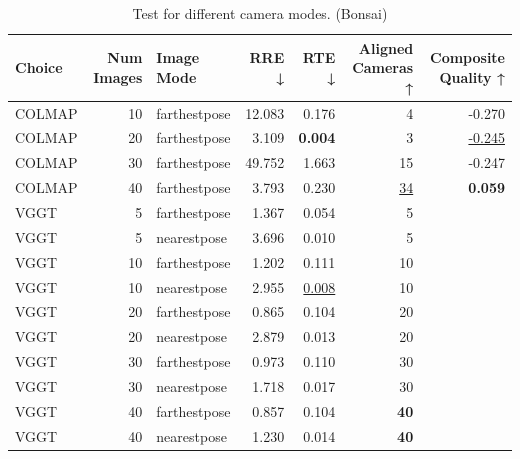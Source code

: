 \begin{table}[H]
\caption{Test for different camera modes. (Bonsai)}
\label{tab:99_nearest_pose_bonsai}
\begin{tabular}{lrlrrrr}
\toprule
Choice & Num Images & Image Mode & RRE ↓ & RTE ↓ & Aligned Cameras ↑ & Composite Quality ↑ \\
\midrule
COLMAP & 10 & farthestpose & 12.083 & 0.176 & 4 & -0.270 \\
COLMAP & 20 & farthestpose & 3.109 & \textbf{0.004} & 3 & \underline{-0.245} \\
COLMAP & 30 & farthestpose & 49.752 & 1.663 & 15 & -0.247 \\
COLMAP & 40 & farthestpose & 3.793 & 0.230 & \underline{34} & \textbf{0.059} \\
VGGT & 5 & farthestpose & 1.367 & 0.054 & 5 &  \\
VGGT & 5 & nearestpose & 3.696 & 0.010 & 5 &  \\
VGGT & 10 & farthestpose & 1.202 & 0.111 & 10 &  \\
VGGT & 10 & nearestpose & 2.955 & \underline{0.008} & 10 &  \\
VGGT & 20 & farthestpose & 0.865 & 0.104 & 20 &  \\
VGGT & 20 & nearestpose & 2.879 & 0.013 & 20 &  \\
VGGT & 30 & farthestpose & 0.973 & 0.110 & 30 &  \\
VGGT & 30 & nearestpose & 1.718 & 0.017 & 30 &  \\
VGGT & 40 & farthestpose & 0.857 & 0.104 & \textbf{40} &  \\
VGGT & 40 & nearestpose & 1.230 & 0.014 & \textbf{40} &  \\
\bottomrule
\end{tabular}
\end{table}
